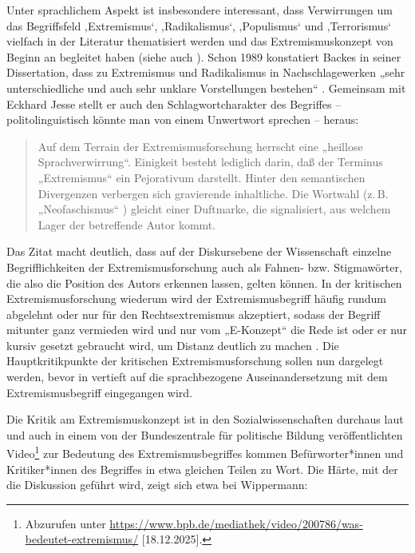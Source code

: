 Unter sprachlichem Aspekt ist insbesondere interessant, dass Verwirrungen um das Begriffsfeld ‚Extremismus`, ‚Radikalismus`, ‚Populismus` und ‚Terrorismus` vielfach in der Literatur thematisiert werden und das Extremismuskonzept von Beginn an begleitet haben (siehe auch ). Schon 1989 konstatiert Backes in seiner Dissertation, dass zu Extremismus und Radikalismus in Nachschlagewerken „sehr unterschiedliche und auch sehr unklare Vorstellungen bestehen`` \autocite[319]{backesPolitischerExtremismusDemokratischen1989}. Gemeinsam mit Eckhard Jesse stellt er auch den Schlagwortcharakter des Begriffes -- politolinguistisch könnte man von einem Unwertwort \autocite{burkhardtDeutscheSprachgeschichteUnd1998} sprechen -- heraus:

\begin{quote}
Auf dem Terrain der Extremismusforschung herrscht eine „heillose Sprachverwirrung``. Einigkeit besteht lediglich darin, daß der Terminus „Extremismus`` ein Pejorativum darstellt. Hinter den semantischen Divergenzen verbergen sich gravierende inhaltliche. Die Wortwahl (z.\,B. „Neofaschismus`` ) gleicht einer Duftmarke, die signalisiert, aus welchem Lager der betreffende Autor kommt. \autocite[49]{backesVergleichendeExtremismusforschung2005}
\end{quote}

Das Zitat macht deutlich, dass auf der Diskursebene der Wissenschaft einzelne Begrifflichkeiten der Extremismusforschung auch als Fahnen- bzw. Stigmawörter, die also die Position des Autors erkennen lassen, gelten können. In der kritischen Extremismusforschung wiederum wird der Extremismusbegriff häufig rundum abgelehnt oder nur für den Rechtsextremismus akzeptiert, sodass der Begriff mitunter ganz vermieden wird und nur vom „E-Konzept`` \autocite[35]{oppenhaeuserExtremismusKonzeptUndProduktion2011} die Rede ist oder er nur kursiv gesetzt gebraucht wird, um Distanz deutlich zu machen \autocite[71]{ackermannMetamorphosenExtremismusbegriffesDiskursanalytische2015}. Die Hauptkritikpunkte der kritischen Extremismusforschung sollen nun dargelegt werden, bevor in  vertieft auf die sprachbezogene Auseinandersetzung mit dem Extremismusbegriff eingegangen wird.

Die Kritik am Extremismuskonzept ist in den Sozialwissenschaften durchaus laut und auch in einem von der Bundeszentrale für politische Bildung veröffentlichten Video\footnote{Abzurufen unter \url{https://www.bpb.de/mediathek/video/200786/was-bedeutet-extremismus/} {[}18.12.2025{]}.} zur Bedeutung des Extremismusbegriffes kommen Befürworter*innen und Kritiker*innen des Begriffes in etwa gleichen Teilen zu Wort. Die Härte, mit der die Diskussion geführt wird, zeigt sich etwa bei Wippermann:

